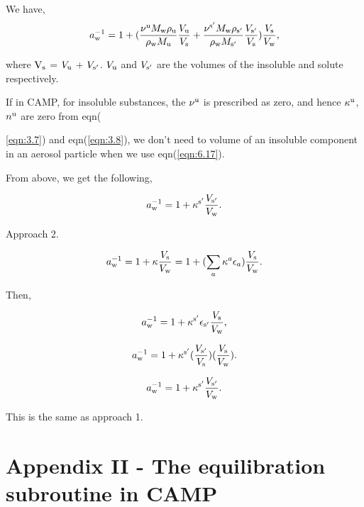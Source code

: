 \documentclass[12pt]{article}
\begin{document}
We have,
\begin{equation}\label{eqn:A5}
a_{\rm w}^{-1}=1+ (  \frac{\nu^{\rm u} M_{\rm w} \rho_{\rm u}}{\rho_{\rm w}M_{\rm u}} 
\frac{V_{\rm u}}{V_{\rm s}} +
\frac{\nu^{\rm s'} M_{\rm w} \rho_{\rm s'}}{\rho_{\rm w} M_{\rm s'}}    
\frac{V_{\rm s'}}{V_{\rm s}})
\frac{V_{\rm s}}{V_{\rm w}},
\end{equation}

where $\rm V_{\rm s}$ = $ V_{\rm u}$ + $V_{\rm s'}$. $V_{\rm u}$ and $V_{\rm s'}$ are the volumes of the insoluble and solute respectively.

If in CAMP, for insoluble substances, the $\nu^{\rm u}$ is prescribed as zero, and hence $\kappa^{\rm u}$, $n^{\rm u}$  are zero from eqn({\ref{eqn:3.7}) and eqn(\ref{eqn:3.8}), we don't need to volume of an insoluble component in an aerosol particle when we use eqn(\ref{eqn:6.17}).

From above, we get the following,

\begin{equation}\label{eqn:A6}
a_{\rm w}^{-1}=1+ \kappa^{\rm s'} \frac{V_{\rm s'}}{V_{\rm w}}.
\end{equation}

Approach 2.

\begin{equation}\label{eqn:A7}
a_{\rm w}^{-1}=1+\kappa \frac{V_{\rm s}}{V_{\rm w}}=1+ (\sum_{a} \kappa^{a} \epsilon_{a})\frac{V_{\rm s}}{V_{\rm w}}.
\end{equation}

Then,

\begin{equation}\label{eqn:A8}
a_{\rm w}^{-1}=1+ \kappa^{\rm s'} \epsilon_{\rm s'} \frac{V_{\rm s}}{V_{\rm w}},
\end{equation}

\begin{equation}\label{eqn:A9}
a_{\rm w}^{-1}=1+ \kappa^{\rm s'} (\frac{V_{\rm s'}}{V_{\rm s}})(\frac{V_{\rm s}}{V_{\rm w}}).
\end{equation}

\begin{equation}\label{eqn:A10}
a_{\rm w}^{-1}=1+ \kappa^{\rm s'} \frac{V_{\rm s'}}{V_{\rm w}}.
\end{equation}

This is the same as approach 1. 


\section{Appendix II - The equilibration subroutine in CAMP}

}
\end{document}
